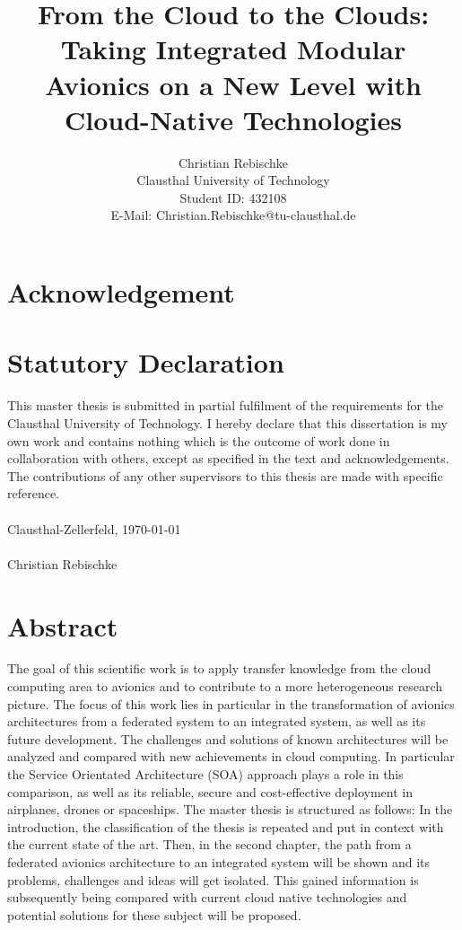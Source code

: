 \documentclass[titlepage]{report}
\title{From the Cloud to the Clouds: Taking Integrated Modular Avionics on a New Level with Cloud-Native Technologies}
\author{Christian Rebischke\\
Clausthal University of Technology\\
Student ID: 432108 \\
E-Mail: Christian.Rebischke@tu-clausthal.de}
\begin{document}
\maketitle
\chapter*{Acknowledgement}
\chapter*{Statutory Declaration}
This master thesis is submitted in partial fulfilment of the requirements for the Clausthal
University of Technology. I hereby declare that this dissertation is my own work and
contains nothing which is the outcome of work done in collaboration with others,
except as specified in the text and acknowledgements. The contributions of any other
supervisors to this thesis are made with specific reference.
\\
\\
Clausthal-Zellerfeld, \today
\\
\\
Christian Rebischke
\chapter*{Abstract}
The goal of this scientific work is to apply transfer knowledge from the cloud computing area to avionics and to
contribute to a more heterogeneous research picture. The focus of this work lies in particular in the transformation
of avionics architectures from a federated system to an integrated system, as well as its future development.
The challenges and solutions of known architectures will be analyzed and compared with new
achievements in cloud computing. In particular
the Service Orientated Architecture (SOA) approach plays a role in this comparison, as well as its
reliable, secure and cost-effective deployment in airplanes, drones or spaceships.
The master thesis is structured as follows: In the introduction, the classification of the thesis is repeated
and put in context with the current state of the art. Then, in the second chapter, the path from a federated
avionics architecture to an integrated system will be shown and its problems, challenges
and ideas will get isolated. This gained information is subsequently being compared with current cloud native technologies
and potential solutions for these subject will be proposed.
\end{document}
